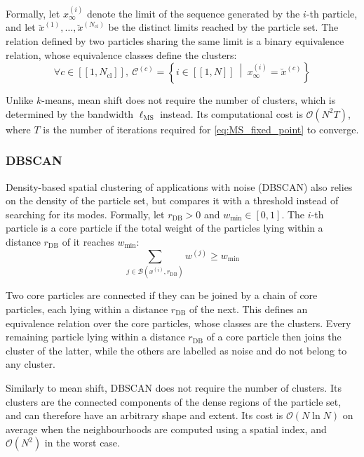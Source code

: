 Formally, let $x_{\infty}^{(i)}$ denote the limit of the sequence generated by the $i$-th particle, and let $\breve{x}^{(1)},\dots,\breve{x}^{(N_{\mathrm{cl}})}$ be the distinct limits reached by the particle set. The relation defined by two particles sharing the same limit is a binary equivalence relation, whose equivalence classes define the clusters:
\begin{equation}
	\forall c\in[\![1,N_{\mathrm{cl}}]\!],\:\mathcal{C}^{(c)}=\left\{i\in[\![1,N]\!]\:\middle|\:x_{\infty}^{(i)}=\breve{x}^{(c)}\right\}
\end{equation}

Unlike $k$-means, mean shift does not require the number of clusters, which is determined by the bandwidth $\ell_{\mathrm{MS}}$ instead. Its computational cost is $\mathcal{O}(N^2T)$, where $T$ is the number of iterations required for \eqref{eq:MS_fixed_point} to converge.

\subsubsection{DBSCAN}%

Density-based spatial clustering of applications with noise (DBSCAN) \cite{bib:DBSCAN} also relies on the density of the particle set, but compares it with a threshold instead of searching for its modes. Formally, let $r_{\mathrm{DB}}>0$ and $w_{\min}\in[0,1]$. The $i$-th particle is a core particle if the total weight of the particles lying within a distance $r_{\mathrm{DB}}$ of it reaches $w_{\min}$:
\begin{equation}
	\sum_{j\in\mathcal{B}\left(x^{(i)},r_{\mathrm{DB}}\right)}w^{(j)}\geq w_{\min}
\end{equation}

Two core particles are connected if they can be joined by a chain of core particles, each lying within a distance $r_{\mathrm{DB}}$ of the next. This defines an equivalence relation over the core particles, whose classes are the clusters. Every remaining particle lying within a distance $r_{\mathrm{DB}}$ of a core particle then joins the cluster of the latter, while the others are labelled as noise and do not belong to any cluster.

Similarly to mean shift, DBSCAN does not require the number of clusters. Its clusters are the connected components of the dense regions of the particle set, and can therefore have an arbitrary shape and extent. Its cost is $\mathcal{O}(N\ln N)$ on average when the neighbourhoods are computed using a spatial index, and $\mathcal{O}(N^2)$ in the worst case.

